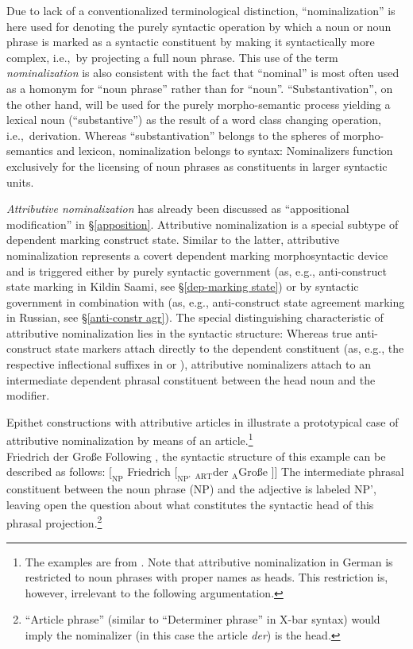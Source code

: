 Due to lack of a conventionalized terminological distinction, “nominalization” is here used for denoting the purely syntactic operation by which a noun or noun phrase is marked as a syntactic constituent by making it syntactically more complex, i.e.,~by projecting a full noun phrase. This use of the term \emph{nominalization} is also consistent with the fact that “nominal” is most often used as a homonym for “noun phrase” rather than for “noun”. “Substantivation”, on the other hand, will be used for the purely morpho-semantic process yielding a lexical noun (“substantive”) as the result of a word class changing operation, i.e.,~derivation. Whereas “substantivation” belongs to the spheres of morpho-semantics and lexicon, nominalization belongs to syntax: Nominalizers function exclusively for the licensing of noun phrases as constituents in larger syntactic units.

\emph{Attributive nominalization} has already been discussed as “appositional modification” in \S\ref{apposition}. Attributive nominalization is a special subtype of dependent marking construct state. Similar to the latter, attributive nominalization represents a covert dependent marking morphosyntactic device and is triggered either by purely syntactic government (as, e.g., anti\hyp{}construct state marking in Kildin Saami, see \S\ref{dep-marking state}) or by syntactic government in combination with  (as, e.g., anti\hyp{}construct state agreement marking in Russian, see \S\ref{anti-constr agr}). The special distinguishing characteristic of attributive nominalization lies in the syntactic structure: Whereas true anti\hyp{}construct state markers attach directly to the dependent constituent (as, e.g., the respective inflectional suffixes in  or ), attributive nominalizers attach to an intermediate dependent phrasal constituent between the head noun and the modifier.

Epithet constructions with attributive articles in  illustrate a prototypical case of attributive nominalization by means of an article.\footnote{The examples are from \citet[179–180]{himmelmann1997}. Note that attributive nominalization in German is restricted to noun phrases with proper names as heads. This restriction is, however, irrelevant to the following argumentation.}
\ea \label{german epithet}
\\
Friedrich der Große 			
\z
Following \citet[180]{himmelmann1997}, the syntactic structure of this example can be described as follows:
\ea	$[_\textrm{NP}$ Friedrich $[_\textrm{NP'}$ $_\textrm{ART}$der $_\textrm{A}$Große $] ]$
\z
The intermediate phrasal constituent between the noun phrase (NP) and the adjective is labeled NP', leaving open the question about what constitutes the syntactic head of this phrasal projection.\footnote{“Article phrase” (similar to “Determiner phrase” in X-bar syntax) would imply the nominalizer (in this case the article \textit{der}) is the head.}

